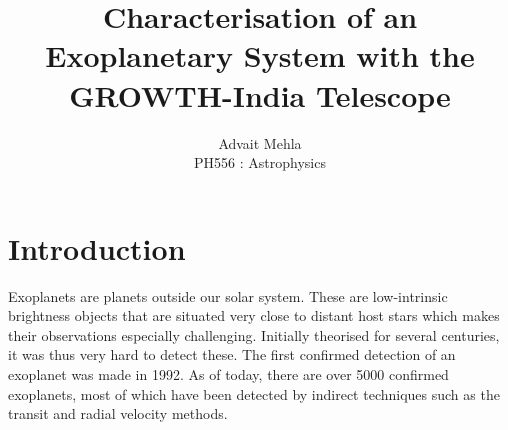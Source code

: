 \documentclass[12pt]{article}
\title{{\huge{ Characterisation of an Exoplanetary System with the GROWTH-India Telescope }}}
\author{Advait Mehla \\ PH556 : Astrophysics }
\date{}
\begin{document}
\maketitle





\section{Introduction}

Exoplanets are planets outside our solar system. These are low-intrinsic brightness objects that are situated very close to distant host stars which makes their observations especially challenging. Initially theorised for several centuries, it was thus very hard to detect these. The first confirmed detection of an exoplanet was made in 1992. As of today, there are over 5000 confirmed exoplanets, most of which have been detected by indirect techniques such as the transit and radial velocity methods.
\end{document}
